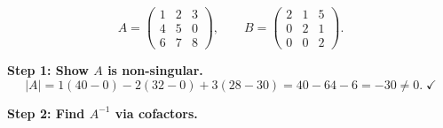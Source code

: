 \documentclass[12pt,a3paper]{article}
\begin{document}
\begin{tcolorbox}[enhanced,breakable,
  colback=cA!4,colframe=cA,boxrule=0.8pt,arc=5pt,
  title={\textbf{Answer --- Non-Singular $A$; Left \& Right Quotients of $B$ by $A$}},
  fonttitle=\bfseries\color{white},colbacktitle=cA]

\[
  A = \begin{pmatrix}1&2&3\\4&5&0\\6&7&8\end{pmatrix}, \qquad
  B = \begin{pmatrix}2&1&5\\0&2&1\\0&0&2\end{pmatrix}.
\]

\textbf{Step 1: Show $A$ is non-singular.}
\[
  |A| = 1(40-0) - 2(32-0) + 3(28-30) = 40-64-6 = -30 \neq 0.\;\checkmark
\]

\textbf{Step 2: Find $A^{-1}$ via cofactors.}


\end{tcolorbox}
\end{document}
